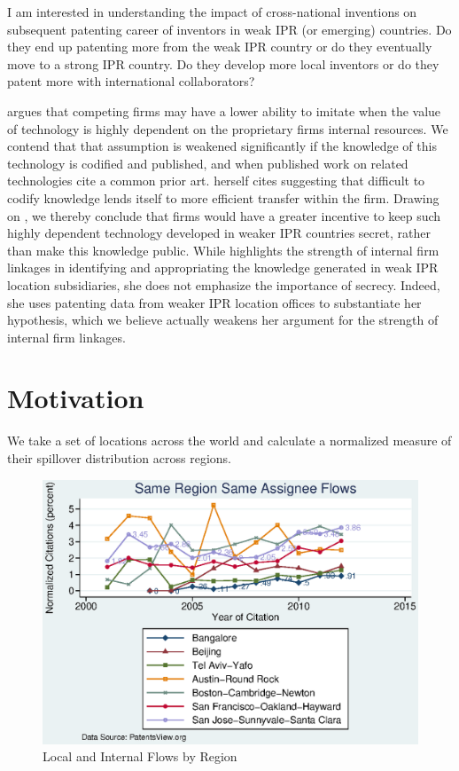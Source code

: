 \documentclass[12pt]{article}
\begin{document}
I am interested in understanding the impact of cross-national inventions on subsequent patenting career of inventors in weak IPR (or emerging) countries. Do they end up patenting more from the weak IPR country or do they eventually move to a strong IPR country. Do they develop more local inventors or do they patent more with international collaborators?

\cite{Zhao2006} argues that competing firms may have a lower ability to imitate when the value of technology is highly dependent on the proprietary firm\textquotesingle s internal resources. We contend that that assumption is weakened significantly if the knowledge of this technology is codified and published, and when published work on related technologies cite a common prior art. \cite{Zhao2006} herself cites \cite{Kogut1993} suggesting that difficult to codify knowledge lends itself to more efficient transfer within the firm. Drawing on \cite{Cohen2000}, we thereby conclude that firms would have a greater incentive to keep such highly dependent technology developed in weaker IPR countries secret, rather than make this knowledge public. While \cite{Zhao2006} highlights the strength of internal firm linkages in identifying and appropriating the knowledge generated in weak IPR location subsidiaries, she does not emphasize the importance of secrecy. Indeed, she uses patenting data from weaker IPR location offices to substantiate her hypothesis, which we believe actually weakens her argument for the strength of internal firm linkages.

\section{Motivation}
We take a set of locations across the world and calculate a normalized measure of their spillover distribution across regions. 
\begin{figure}[h]
\begin{centering}
  \includegraphics[width=\textwidth]{SameRegionSameAssigneeFlows}
  \caption{Local and Internal Flows by Region}
  \label{fig:SameRegionSameAssigneeFlows}
\end{centering}
\end{figure}
\end{document}
